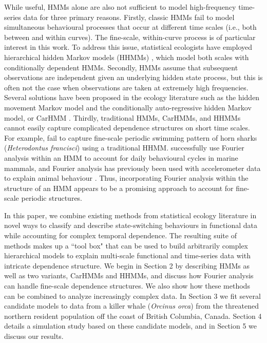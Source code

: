 While useful, HMMs alone are also not sufficient to model high-frequency time-series data for three primary reasons.
Firstly, classic HMMs fail to model simultaneous behavioural processes that occur at different time scales (i.e., both between and within curves). The fine-scale, within-curve process is of particular interest in this work. To address this issue, statistical ecologists have employed hierarchical hidden Markov models (HHMMs) \citep{Barajas:2017,Adam:2019}, which model both scales with conditionally dependent HMMs.
Secondly, HMMs assume that subsequent observations are independent given an underlying hidden state process, but this is often not the case when observations are taken at extremely high frequencies. Several solutions have been proposed in the ecology literature such as the hidden movement Markov model \citep{Whoriskey:2016} and the conditionally auto-regressive hidden Markov model, or CarHMM \citep{Lawler:2019}. 
Thirdly, traditional HMMs, CarHMMs, and HHMMs cannot easily capture complicated dependence structures on short time scales. For example, \citet{Adam:2019} fail to capture fine-scale periodic swimming pattern of horn sharks (\textit{Heterodontus francisci}) using a traditional HHMM. \citet{Heerah:2017} successfully use Fourier analysis within an HMM to account for daily behavioural cycles in marine mammals, and Fourier analysis has previously been used with accelerometer data to explain animal behaviour \citep{Fehlmann:2017,Shorter:2017}. Thus, incorporating Fourier analysis within the structure of an HMM appears to be a promising approach to account for fine-scale periodic structures.

In this paper, we combine existing methods from statistical ecology literature in novel ways to classify and describe state-switching behaviours in functional data while accounting for complex temporal dependence. The resulting suite of methods makes up a ``tool box" that can be used to build arbitrarily complex hierarchical models to explain multi-scale functional and time-series data with intricate dependence structure.
We begin in Section 2 by describing HMMs as well as two variants, CarHMMs and HHMMs, and discuss how Fourier analysis can handle fine-scale dependence structures. We also show how these methods can be combined to analyze increasingly complex data. In Section 3 we fit several candidate models to data from a killer whale (\textit{Orcinus orca}) from the threatened northern resident population off the coast of British Columbia, Canada. Section 4 details a simulation study based on these candidate models, and in Section 5 we discuss our results.